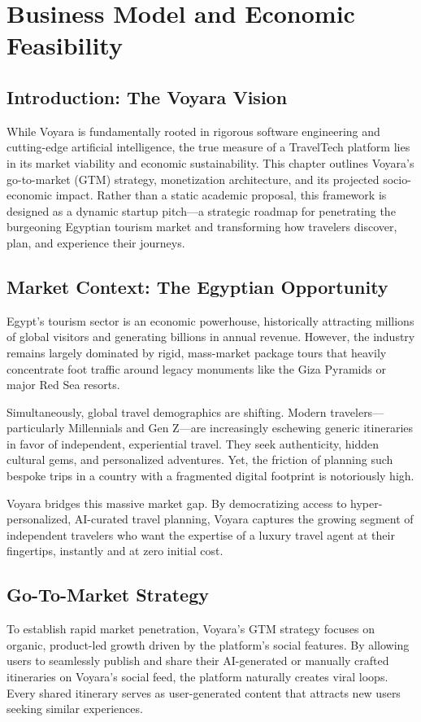 \chapter{Business Model and Economic Feasibility}

\section{Introduction: The Voyara Vision}
While Voyara is fundamentally rooted in rigorous software engineering and cutting-edge artificial intelligence, the true measure of a TravelTech platform lies in its market viability and economic sustainability. This chapter outlines Voyara's go-to-market (GTM) strategy, monetization architecture, and its projected socio-economic impact. Rather than a static academic proposal, this framework is designed as a dynamic startup pitch—a strategic roadmap for penetrating the burgeoning Egyptian tourism market and transforming how travelers discover, plan, and experience their journeys.

\section{Market Context: The Egyptian Opportunity}
Egypt's tourism sector is an economic powerhouse, historically attracting millions of global visitors and generating billions in annual revenue. However, the industry remains largely dominated by rigid, mass-market package tours that heavily concentrate foot traffic around legacy monuments like the Giza Pyramids or major Red Sea resorts. 

Simultaneously, global travel demographics are shifting. Modern travelers—particularly Millennials and Gen Z—are increasingly eschewing generic itineraries in favor of independent, experiential travel. They seek authenticity, hidden cultural gems, and personalized adventures. Yet, the friction of planning such bespoke trips in a country with a fragmented digital footprint is notoriously high. 

Voyara bridges this massive market gap. By democratizing access to hyper-personalized, AI-curated travel planning, Voyara captures the growing segment of independent travelers who want the expertise of a luxury travel agent at their fingertips, instantly and at zero initial cost.

\section{Go-To-Market Strategy}
To establish rapid market penetration, Voyara's GTM strategy focuses on organic, product-led growth driven by the platform's social features. By allowing users to seamlessly publish and share their AI-generated or manually crafted itineraries on Voyara's social feed, the platform naturally creates viral loops. Every shared itinerary serves as user-generated content that attracts new users seeking similar experiences. 

